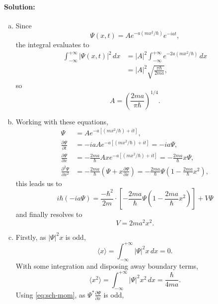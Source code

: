 \documentclass{article}
\begin{document}
\paragraph{Solution:}
\begin{enumerate}[(a)]
  \item Since \[ \Psi(x, t) = Ae^{-a(mx^2/\hbar)}e^{-iat}, \] the integral
    evaluates to
    \begin{align*}
      \int_{-\infty}^{+\infty} |\Psi(x, t)|^2 \,dx
      &= |A|^2 \int_{-\infty}^{+\infty} e^{-2a(mx^2/\hbar)} \,dx \\
      &= |A|^2 \sqrt{\frac{\pi\hbar}{2ma}},
    \end{align*}
    so \[ A = \left(\frac{2ma}{\pi\hbar}\right)^{1/4}. \]
  \item Working with these equations,
    \begin{align*}
      \Psi &= Ae^{-a[(mx^2/\hbar) + it]}, \\
      \frac{\partial\Psi}{\partial t}
           &= -iaAe^{-a[(mx^2/\hbar) + it]} = -ia\Psi, \\
      \frac{\partial\Psi}{\partial x}
           &= -\frac{2ma}{\hbar}Axe^{-a[(mx^2/\hbar) + it]}
           = -\frac{2ma}{\hbar}x\Psi, \\
      \frac{\partial^2\Psi}{\partial x^2}
           &= -\frac{2ma}{\hbar}\left(
            \Psi + x\frac{\partial\Psi}{\partial x}
           \right)
           = -\frac{2ma}{\hbar}\Psi\left(
             1 - \frac{2ma}{\hbar}x^2
           \right),
    \end{align*}
    this leads us to
    \begin{equation*}
      i\hbar(-ia\Psi) = \frac{-\hbar^2}{2m} \cdot \left[
        -\frac{2ma}{\hbar}\Psi\left(1 - \frac{2ma}{\hbar}x^2\right)
      \right] + V\Psi
    \end{equation*} and finally resolves to \[ V = 2ma^2x^2. \]
  \item Firstly, as $|\Psi|^2x$ is odd,
    \begin{equation*}
      \langle x \rangle
      = \int_{-\infty}^{+\infty} |\Psi|^2x \,dx
      = 0.
    \end{equation*}
    With some integration and disposing away boundary terms,
    \begin{equation*}
      \langle x^2 \rangle
      = \int_{-\infty}^{+\infty} |\Psi|^2x^2 \,dx
      = \frac{\hbar}{4ma}.
    \end{equation*}
    Using \eqref{eq:sch-mom}, as $\Psi^* \frac{\partial\Psi}{\partial x}$ is
    odd,
    \begin{equation*}

\end{equation*}
\end{enumerate}
\end{document}
